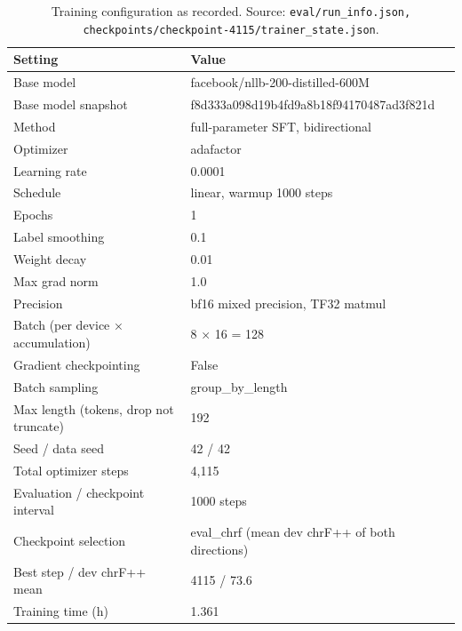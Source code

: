 \begin{table}[t]
\centering
\small
\begin{tabular}{ll}
\toprule
Setting & Value \\
\midrule
Base model & facebook/nllb-200-distilled-600M \\
Base model snapshot & f8d333a098d19b4fd9a8b18f94170487ad3f821d \\
Method & full-parameter SFT, bidirectional \\
Optimizer & adafactor \\
Learning rate & 0.0001 \\
Schedule & linear, warmup 1000 steps \\
Epochs & 1 \\
Label smoothing & 0.1 \\
Weight decay & 0.01 \\
Max grad norm & 1.0 \\
Precision & bf16 mixed precision, TF32 matmul \\
Batch (per device × accumulation) & 8 × 16 = 128 \\
Gradient checkpointing & False \\
Batch sampling & group\_by\_length \\
Max length (tokens, drop not truncate) & 192 \\
Seed / data seed & 42 / 42 \\
Total optimizer steps & 4,115 \\
Evaluation / checkpoint interval & 1000 steps \\
Checkpoint selection & eval\_chrf (mean dev chrF++ of both directions) \\
Best step / dev chrF++ mean & 4115 / 73.6 \\
Training time (h) & 1.361 \\
\bottomrule
\end{tabular}
\caption{Training configuration as recorded. Source: \texttt{eval/run\_info.json, checkpoints/checkpoint-4115/trainer\_state.json}.}
\label{tab:e01-hyperparameters}
\end{table}
